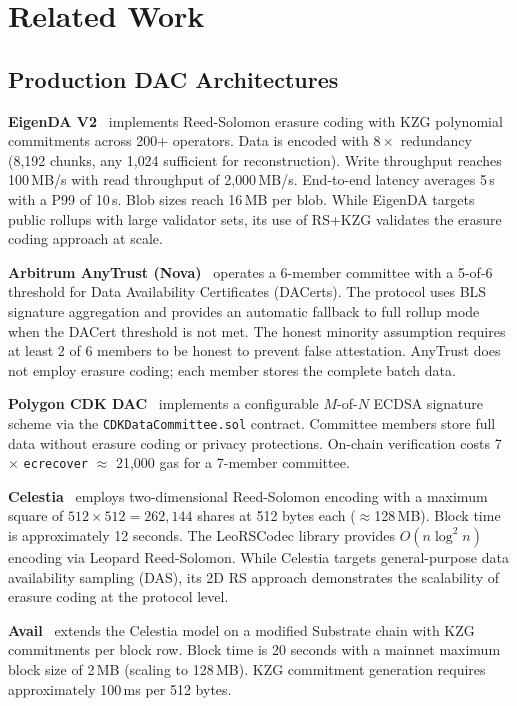 
\section{Related Work}
\label{sec:related}

\subsection{Production DAC Architectures}

\textbf{EigenDA V2}~\cite{eigenda2024v2} implements Reed-Solomon erasure
coding with KZG polynomial commitments across 200+ operators. Data is
encoded with $8\times$ redundancy (8{,}192 chunks, any 1{,}024 sufficient
for reconstruction). Write throughput reaches 100\,MB/s with read
throughput of 2{,}000\,MB/s. End-to-end latency averages 5\,s with a
P99 of 10\,s. Blob sizes reach 16\,MB per blob. While EigenDA targets
public rollups with large validator sets, its use of RS+KZG validates
the erasure coding approach at scale.

\textbf{Arbitrum AnyTrust (Nova)}~\cite{anytrust} operates a 6-member
committee with a 5-of-6 threshold for Data Availability Certificates
(DACerts). The protocol uses BLS signature aggregation and provides an
automatic fallback to full rollup mode when the DACert threshold is not
met. The honest minority assumption requires at least 2 of 6 members to
be honest to prevent false attestation. AnyTrust does not employ erasure
coding; each member stores the complete batch data.

\textbf{Polygon CDK DAC}~\cite{polygoncdk} implements a configurable
$M$-of-$N$ ECDSA signature scheme via the \texttt{CDKDataCommittee.sol}
contract. Committee members store full data without erasure coding or
privacy protections. On-chain verification costs 7 $\times$
\texttt{ecrecover} $\approx$ 21{,}000 gas for a 7-member committee.

\textbf{Celestia}~\cite{celestia} employs two-dimensional Reed-Solomon
encoding with a maximum square of $512 \times 512 = 262{,}144$ shares at
512 bytes each ($\approx$128\,MB). Block time is approximately 12
seconds. The LeoRSCodec library provides $O(n \log^2 n)$ encoding via
Leopard Reed-Solomon. While Celestia targets general-purpose data
availability sampling (DAS), its 2D RS approach demonstrates the
scalability of erasure coding at the protocol level.

\textbf{Avail}~\cite{avail} extends the Celestia model on a modified
Substrate chain with KZG commitments per block row. Block time is 20
seconds with a mainnet maximum block size of 2\,MB (scaling to 128\,MB).
KZG commitment generation requires approximately 100\,ms per 512 bytes.

